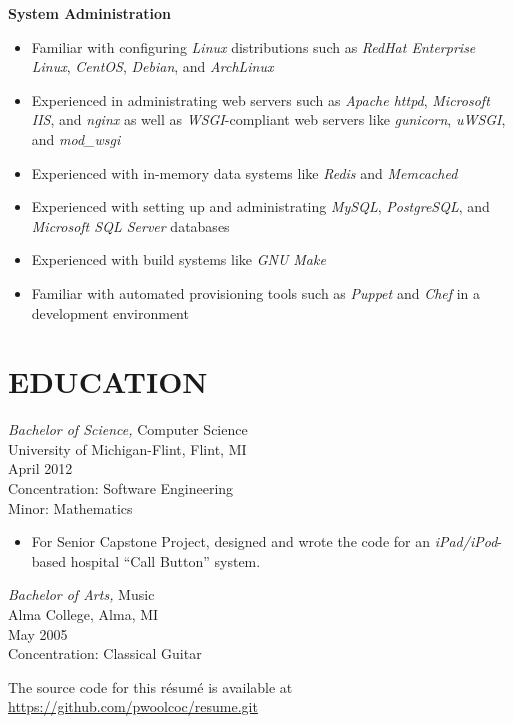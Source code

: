 \documentclass[line,margin]{res}
\begin{document}
\begin{resume}
    \textbf{System Administration}
    \begin{itemize}
        \item Familiar with configuring {\sl Linux} distributions such as {\sl RedHat
              Enterprise Linux}, {\sl CentOS}, {\sl Debian}, and {\sl ArchLinux}
        \item Experienced in administrating web servers such as {\sl Apache httpd},
              {\sl Microsoft IIS}, and {\sl nginx} as well as
              {\sl WSGI}-compliant web servers like {\sl gunicorn},
              {\sl uWSGI}, and {\sl mod\_wsgi}
        \item Experienced with in-memory data systems like {\sl Redis} and {\sl Memcached}
        \item Experienced with setting up and administrating {\sl MySQL},
              {\sl PostgreSQL}, and {\sl Microsoft SQL Server} databases
        \item Experienced with build systems like {\sl GNU Make}
        \item Familiar with automated provisioning tools such as {\sl Puppet}
              and {\sl Chef} in a development environment
    \end{itemize}



\section{EDUCATION} 
                {\sl Bachelor of Science,} Computer Science \\
                University of Michigan-Flint, Flint, MI \\
                April 2012 \\
                Concentration: Software Engineering \\
                Minor: Mathematics
                \begin{itemize}
                    \item For Senior Capstone Project, designed and wrote 
                            the code for an {\sl iPad/iPod}-based hospital
                            ``Call Button'' system.
                \end{itemize}

                {\sl Bachelor of Arts,} Music \\
                Alma College, Alma, MI \\
                May 2005 \\
                Concentration: Classical Guitar

\end{resume}

The source code for this r\'{e}sum\'{e} is available at \href{https://github.com/pwoolcoc/resume.git}{https://github.com/pwoolcoc/resume.git}

\pagestyle{fancy}
\end{document}
